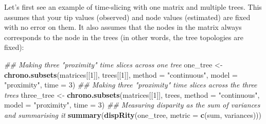 \documentclass[
]{book}
\newenvironment{Shaded}{\begin{snugshade}}{\end{snugshade}}
\newcommand{\CommentTok}[1]{\textcolor[rgb]{0.56,0.35,0.01}{\textit{#1}}}
\newcommand{\ControlFlowTok}[1]{\textcolor[rgb]{0.13,0.29,0.53}{\textbf{#1}}}
\newcommand{\DataTypeTok}[1]{\textcolor[rgb]{0.13,0.29,0.53}{#1}}
\newcommand{\DecValTok}[1]{\textcolor[rgb]{0.00,0.00,0.81}{#1}}
\newcommand{\KeywordTok}[1]{\textcolor[rgb]{0.13,0.29,0.53}{\textbf{#1}}}
\newcommand{\NormalTok}[1]{#1}
\newcommand{\OperatorTok}[1]{\textcolor[rgb]{0.81,0.36,0.00}{\textbf{#1}}}
\newcommand{\OtherTok}[1]{\textcolor[rgb]{0.56,0.35,0.01}{#1}}
\newcommand{\StringTok}[1]{\textcolor[rgb]{0.31,0.60,0.02}{#1}}
\begin{document}
\begin{Shaded}
\end{Shaded}

Let's first see an example of time-slicing with one matrix and multiple trees.
This assumes that your tip values (observed) and node values (estimated) are fixed with no error on them.
It also assumes that the nodes in the matrix always corresponds to the node in the trees (in other words, the tree topologies are fixed):

\begin{Shaded}
\begin{Highlighting}[]
\CommentTok{\#\# Making three "proximity" time slices across one tree}
\NormalTok{one\_tree \textless{}{-}}\StringTok{ }\KeywordTok{chrono.subsets}\NormalTok{(matrices[[}\DecValTok{1}\NormalTok{]], trees[[}\DecValTok{1}\NormalTok{]],}
                           \DataTypeTok{method =} \StringTok{"continuous"}\NormalTok{,}
                           \DataTypeTok{model =} \StringTok{"proximity"}\NormalTok{, }\DataTypeTok{time =} \DecValTok{3}\NormalTok{)}
\CommentTok{\#\# Making three "proximity" time slices across the three trees}
\NormalTok{three\_tree \textless{}{-}}\StringTok{ }\KeywordTok{chrono.subsets}\NormalTok{(matrices[[}\DecValTok{1}\NormalTok{]], trees,}
                             \DataTypeTok{method =} \StringTok{"continuous"}\NormalTok{,}
                             \DataTypeTok{model =} \StringTok{"proximity"}\NormalTok{, }\DataTypeTok{time =} \DecValTok{3}\NormalTok{)}
\CommentTok{\#\# Measuring disparity as the sum of variances and summarising it}
\KeywordTok{summary}\NormalTok{(}\KeywordTok{dispRity}\NormalTok{(one\_tree, }\DataTypeTok{metric =} \KeywordTok{c}\NormalTok{(sum, variances)))}
\end{Highlighting}
\end{Shaded}
\end{document}
